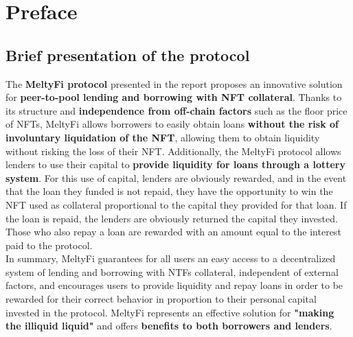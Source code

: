 \section{Preface}\label{sec:preface}

\subsection{Brief presentation of the protocol}
The \textbf{MeltyFi protocol} presented in the report proposes an innovative solution for \textbf{peer-to-pool lending and borrowing with NFT collateral}. Thanks to its structure and \textbf{independence from off-chain factors} such as the floor price of NFTs, MeltyFi allows borrowers to easily obtain loans \textbf{without the risk of involuntary liquidation of the NFT}, allowing them to obtain liquidity without risking the loss of their NFT. Additionally, the MeltyFi protocol allows lenders to use their capital to \textbf{provide liquidity for loans through a lottery system}. For this use of capital, lenders are obviously rewarded, and in the event that the loan they funded is not repaid, they have the opportunity to win the NFT used as collateral proportional to the capital they provided for that loan. If the loan is repaid, the lenders are obviously returned the capital they invested. Those who also repay a loan are rewarded with an amount equal to the interest paid to the protocol. 
\\
\indent In summary, MeltyFi guarantees for all users an easy access to a decentralized system of lending and borrowing with NTFs collateral, independent of external factors, and encourages users to provide liquidity and repay loans in order to be rewarded for their correct behavior in proportion to their personal capital invested in the protocol. MeltyFi represents an effective solution for \textbf{"making the illiquid liquid"} and offers \textbf{benefits to both borrowers and lenders}.

